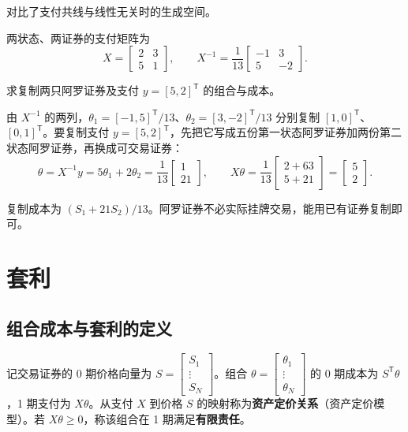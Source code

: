  对比了支付共线与线性无关时的生成空间。


\begin{tcolorbox}[example,title=课堂例题：先复制阿罗证券，再复制任意支付]
\begin{question}
两状态、两证券的支付矩阵为
\[
 X=\begin{bmatrix}2&3\\5&1\end{bmatrix},\qquad
 X^{-1}=\frac1{13}\begin{bmatrix}-1&3\\5&-2\end{bmatrix}.
\]

求复制两只阿罗证券及支付 $y=[5,2]^{\mathsf T}$ 的组合与成本。
\end{question}
\begin{solution}
由 $X^{-1}$ 的两列，$\theta_1=[-1,5]^{\mathsf T}/13$、$\theta_2=[3,-2]^{\mathsf T}/13$ 分别复制 $[1,0]^{\mathsf T}$、$[0,1]^{\mathsf T}$。要复制支付 $y=[5,2]^{\mathsf T}$，先把它写成五份第一状态阿罗证券加两份第二状态阿罗证券，再换成可交易证券：
\[
 \theta=X^{-1}y=5\theta_1+2\theta_2
 =\frac1{13}\begin{bmatrix}1\\21\end{bmatrix},\qquad
 X\theta=\frac1{13}\begin{bmatrix}2+63\\5+21\end{bmatrix}
 =\begin{bmatrix}5\\2\end{bmatrix}.
\]

复制成本为 $(S_1+21S_2)/13$。阿罗证券不必实际挂牌交易，能用已有证券复制即可。
\end{solution}
\end{tcolorbox}

\section{套利}\label{sec:wj-four-arbitrage}
\subsection{组合成本与套利的定义}
\begin{tcolorbox}[knowledge,title=组合成本、支付与有限责任]
记交易证券的 0 期价格向量为 $S=\begin{bmatrix}S_1 \\ \vdots \\ S_N\end{bmatrix}$。组合 $\theta=\begin{bmatrix}\theta_1 \\ \vdots \\ \theta_N\end{bmatrix}$ 的 0 期成本为 $S^{\mathsf T}\theta$，1 期支付为 $X\theta$。从支付 $X$ 到价格 $S$ 的映射称为\textbf{资产定价关系}（资产定价模型）。若 $X\theta\ge 0$，称该组合在 1 期满足\textbf{有限责任}。
\end{tcolorbox}

